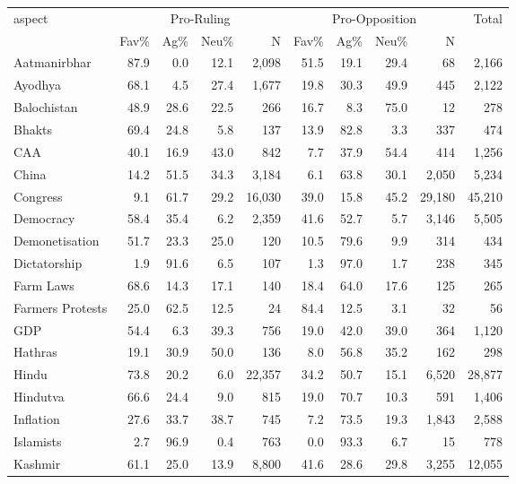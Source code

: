 \begin{table}[htbp]
\centering
\scriptsize
\setlength{\tabcolsep}{4pt}
\begin{tabular}{lrrrrrrrrr}
\toprule
\multirow{2}{*}{aspect} & \multicolumn{4}{c}{Pro-Ruling} & \multicolumn{4}{c}{Pro-Opposition} & \multirow{2}{*}{Total} \\
\cmidrule(lr){2-5}\cmidrule(lr){6-9}
& Fav\% & Ag\% & Neu\% & N & Fav\% & Ag\% & Neu\% & N & \\
\midrule
Aatmanirbhar & 87.9 & 0.0 & 12.1 & 2,098 & 51.5 & 19.1 & 29.4 & 68 & 2,166 \\
Ayodhya & 68.1 & 4.5 & 27.4 & 1,677 & 19.8 & 30.3 & 49.9 & 445 & 2,122 \\
Balochistan & 48.9 & 28.6 & 22.5 & 266 & 16.7 & 8.3 & 75.0 & 12 & 278 \\
Bhakts & 69.4 & 24.8 & 5.8 & 137 & 13.9 & 82.8 & 3.3 & 337 & 474 \\
CAA & 40.1 & 16.9 & 43.0 & 842 & 7.7 & 37.9 & 54.4 & 414 & 1,256 \\
China & 14.2 & 51.5 & 34.3 & 3,184 & 6.1 & 63.8 & 30.1 & 2,050 & 5,234 \\
Congress & 9.1 & 61.7 & 29.2 & 16,030 & 39.0 & 15.8 & 45.2 & 29,180 & 45,210 \\
Democracy & 58.4 & 35.4 & 6.2 & 2,359 & 41.6 & 52.7 & 5.7 & 3,146 & 5,505 \\
Demonetisation & 51.7 & 23.3 & 25.0 & 120 & 10.5 & 79.6 & 9.9 & 314 & 434 \\
Dictatorship & 1.9 & 91.6 & 6.5 & 107 & 1.3 & 97.0 & 1.7 & 238 & 345 \\
Farm Laws & 68.6 & 14.3 & 17.1 & 140 & 18.4 & 64.0 & 17.6 & 125 & 265 \\
Farmers Protests & 25.0 & 62.5 & 12.5 & 24 & 84.4 & 12.5 & 3.1 & 32 & 56 \\
GDP & 54.4 & 6.3 & 39.3 & 756 & 19.0 & 42.0 & 39.0 & 364 & 1,120 \\
Hathras & 19.1 & 30.9 & 50.0 & 136 & 8.0 & 56.8 & 35.2 & 162 & 298 \\
Hindu & 73.8 & 20.2 & 6.0 & 22,357 & 34.2 & 50.7 & 15.1 & 6,520 & 28,877 \\
Hindutva & 66.6 & 24.4 & 9.0 & 815 & 19.0 & 70.7 & 10.3 & 591 & 1,406 \\
Inflation & 27.6 & 33.7 & 38.7 & 745 & 7.2 & 73.5 & 19.3 & 1,843 & 2,588 \\
Islamists & 2.7 & 96.9 & 0.4 & 763 & 0.0 & 93.3 & 6.7 & 15 & 778 \\
Kashmir & 61.1 & 25.0 & 13.9 & 8,800 & 41.6 & 28.6 & 29.8 & 3,255 & 12,055 \\

\end{tabular}
\end{table}
